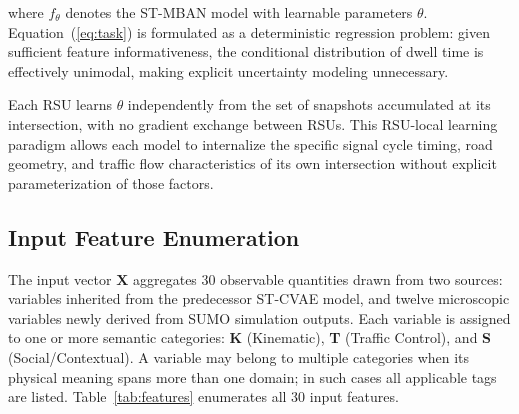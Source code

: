 \documentclass[journal]{IEEEtran}
\begin{document}
where $f_\theta$ denotes the ST-MBAN model with learnable parameters $\theta$.
Equation~(\ref{eq:task}) is formulated as a deterministic regression problem:
given sufficient feature informativeness, the conditional distribution of dwell time
is effectively unimodal, making explicit uncertainty modeling unnecessary.

Each RSU learns $\theta$ independently from the set of snapshots accumulated at its
intersection, with no gradient exchange between RSUs.
This RSU-local learning paradigm allows each model to internalize the specific
signal cycle timing, road geometry, and traffic flow characteristics of its own
intersection without explicit parameterization of those factors.

\subsection{Input Feature Enumeration}
\label{sec.net.D}

The input vector $\mathbf{X}$ aggregates 30 observable quantities drawn from
two sources: variables inherited from the predecessor ST-CVAE model, and
twelve microscopic variables newly derived from SUMO simulation outputs.
Each variable is assigned to one or more semantic categories:
\textbf{K} (Kinematic), \textbf{T} (Traffic Control), and
\textbf{S} (Social/Contextual).
A variable may belong to multiple categories when its physical meaning spans
more than one domain; in such cases all applicable tags are listed.
Table~\ref{tab:features} enumerates all 30 input features.
\end{document}
